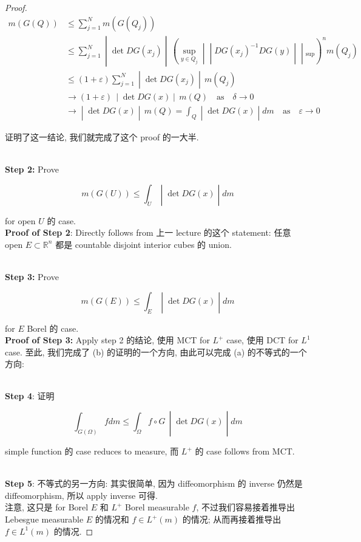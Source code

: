 \begin{proof}
\[\begin{matrix}
{m(G(Q))} & {\leq \sum\limits_{j = 1}^{N}m(G(Q_{j}))} \\
 & \left. \leq \sum\limits_{j = 1}^{N} \middle| \det DG(x_{j}) \middle| \,(\sup\limits_{y \in Q_{j}} \middle| \middle| DG(x_{j})^{- 1}DG(y) \middle| \middle| {}_{\sup})^{n}m(Q_{j}) \right. \\
 & \left. \leq (1 + \varepsilon)\sum\limits_{j = 1}^{N} \middle| \det DG(x_{j}) \middle| \, m(Q_{j}) \right. \\
 & \left. \rightarrow(1 + \varepsilon)\, \middle| \det DG(x) \middle| \, m(Q)\quad\text{as}\quad\delta\rightarrow 0 \right. \\
 & \left. \rightarrow \middle| \det DG(x) \middle| \, m(Q) = \int_{Q} \middle| \det DG(x) \middle| dm\quad\text{as}\quad\varepsilon\rightarrow 0 \right.
\end{matrix}\]

证明了这一结论, 我们就完成了这个 proof 的一大半.\\
\strut \\
\textbf{Step 2:} Prove

\[\left. m(G(U)) \leq \int_{U} \middle| \det DG(x) \middle| dm \right.\]

for open \(U\) 的 case.\\
\textbf{Proof of Step 2}: Directly follows from 上一 lecture 的这个 statement: 任意 open \(E \subset \mathbb{R}^{n}\) 都是 countable disjoint interior cubes 的 union.\\
\strut \\
\textbf{Step 3:} Prove

\[\left. m(G(E)) \leq \int_{E} \middle| \det DG(x) \middle| dm \right.\]

for \(E\) Borel 的 case.\\
\textbf{Proof of Step 3:} Apply step 2 的结论, 使用 MCT for \(L^{+}\) case, 使用 DCT for \(L^{1}\) case. 至此, 我们完成了 (b) 的证明的一个方向, 由此可以完成 (a) 的不等式的一个方向:\\
\strut \\
\textbf{Step 4}: 证明

\[\left. \int_{G(\Omega)}f dm \leq \int_{\Omega}f \circ G\, \middle| \det DG(x) \middle| dm \right.\]

simple function 的 case reduces to measure, 而 \(L^{+}\) 的 case follows from MCT.\\
\strut \\
\textbf{Step 5}: 不等式的另一方向: 其实很简单, 因为 diffeomorphism 的 inverse 仍然是 diffeomorphism, 所以 apply inverse 可得.\\
注意, 这只是 for Borel \(E\) 和 \(L^{+}\) Borel measurable \(f\), 不过我们容易接着推导出 Lebesgue measurable \(E\) 的情况和 \(f \in L^{+}(m)\) 的情况; 从而再接着推导出 \(f \in L^{1}(m)\) 的情况.

\end{proof}

